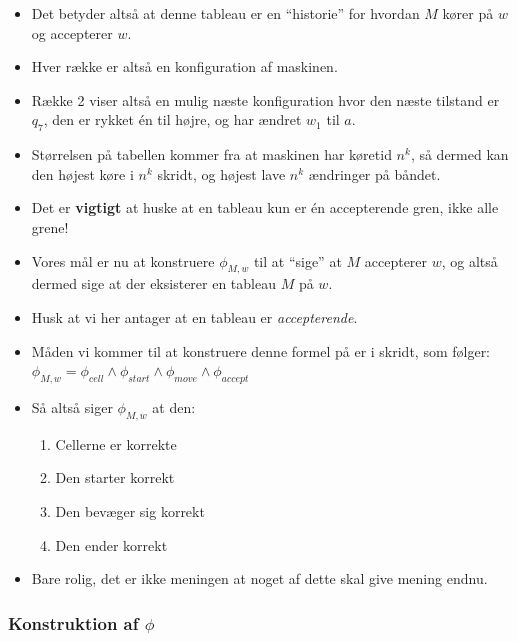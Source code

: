\begin{frame}[allowframebreaks]
  \begin{itemize}
	\item Det betyder altså at denne tableau er en ``historie'' for hvordan $M$ kører på $w$ og accepterer $w$.
	\item Hver række er altså en konfiguration af maskinen.
	\item Række 2 viser altså en mulig næste konfiguration hvor den næste tilstand er $q_{7}$, den er rykket én til højre, og har ændret $w_{1}$ til $a$.
	\item Størrelsen på tabellen kommer fra at maskinen har køretid $n^{k}$, så dermed kan den højest køre i $n^{k}$ skridt, og højest lave $n^{k}$ ændringer på båndet.
	\item Det er \textbf{vigtigt} at huske at en tableau kun er én accepterende gren, ikke alle grene!
	\item Vores mål er nu at konstruere \(\phi_{M,w}\) til at ``sige'' at $M$ accepterer $w$, og altså dermed sige at der eksisterer en tableau $M$ på $w$.
	\item Husk at vi her antager at en tableau er \textit{accepterende}.
	\item Måden vi kommer til at konstruere denne formel på er i skridt, som følger: \(\phi_{M,w} = \phi_{cell} \land \phi_{start} \land \phi_{move} \land \phi_{accept}\)
	\item Så altså siger \(\phi_{M,w}\) at den:
		  \begin{enumerate}
			\item Cellerne er korrekte
			\item Den starter korrekt
			\item Den bevæger sig korrekt
			\item Den ender korrekt
		  \end{enumerate}
	\item Bare rolig, det er ikke meningen at noget af dette skal give mening endnu.
  \end{itemize}
\end{frame}

\begin{frame}[allowframebreaks]
  \frametitle{Konstruktion af \(\phi\)}

\end{frame}

